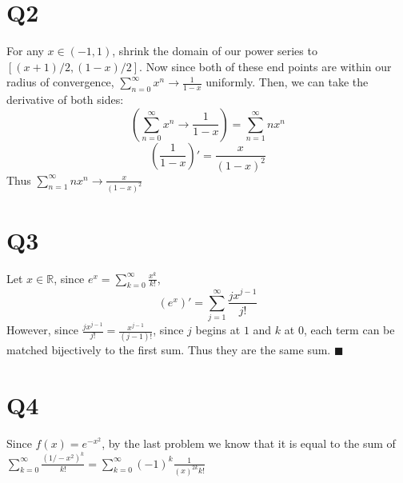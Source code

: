 \documentclass[12pt]{article}
\newcommand{\R}{\mathbb{R}}
\begin{document}
\section{Q2}
For any $x \in (-1,1)$, shrink the domain of our power series to $[(x+1)/2, (1-x)/2]$. Now since both of these end points are within our radius of convergence, $\sum_{n=0}^{\infty}x^n \to \frac{1}{1-x}$ uniformly.
\newline
Then, we can take the derivative of both sides:
$$(\sum_{n=0}^{\infty}x^n \to \frac{1}{1-x}) = \sum_{n=1}^{\infty}nx^n$$
$$(\frac{1}{1-x})' = \frac{x}{(1-x)^2}$$
Thus $\sum_{n=1}^{\infty}nx^n \to \frac{x}{(1-x)^2}$
\newpage


\section{Q3}
Let $x \in \R$, since $e^x = \sum_{k=0}^{\infty}\frac{x^k}{k!}$,
$$(e^x)' = \sum_{j=1}^{\infty}\frac{jx^{j-1}}{j!}$$
However, since $\frac{jx^{j-1}}{j!} = \frac{x^{j-1}}{(j-1)!}$, since $j$ begins at $1$ and $k$ at $0$, each term can be matched bijectively to the first sum.
\newline
Thus they are the same sum. $\blacksquare$
\newpage


\section{Q4}
Since $f(x)=e^{-x^2}$, by the last problem we know that it is equal to the sum of $\sum_{k=0}^{\infty}\frac{(1/-x^2)^k}{k!} = \sum_{k=0}^{\infty}(-1)^k\frac{1}{(x)^{2k}k!}$
\newline
\end{document}
